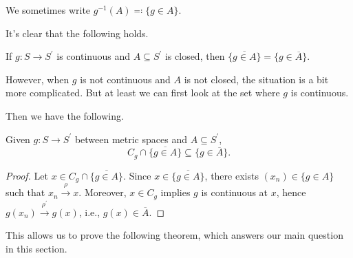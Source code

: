 \begin{notation}
	We sometimes write \(g ^{-1} (A) \eqqcolon \{ g \in A \} \).
\end{notation}

It's clear that the following holds.

\begin{note}
	If \(g \colon S \to S^{\prime} \) is continuous and \(A \subseteq S^{\prime} \) is closed, then \(\overline{\{ g \in A \} } = \{ g \in \overline{A} \}\).
\end{note}

However, when \(g\) is not continuous and \(A\) is not closed, the situation is a bit more complicated. But at least we can first look at the set where \(g\) is continuous.


Then we have the following.

\begin{proposition}\label{prop:lec4}
	Given \(g\colon S \to S^{\prime} \) between metric spaces and \(A \subseteq S^{\prime} \),
	\[
		C_g \cap \overline{\{ g\in A \} }
		\subseteq \{ g \in \overline{A}  \}.
	\]
\end{proposition}
\begin{proof}
	Let \(x \in C_g \cap \overline{\{ g\in A \} }\). Since \(x\in \overline{\{ g\in A \} }\), there exists \((x_n) \in \{ g\in A \} \) such that \(x_n \overset{\rho }{\to } x\). Moreover, \(x\in C_g\) implies \(g\) is continuous at \(x\), hence \(g(x_n) \overset{\rho ^{\prime} }{\to } g(x)\), i.e., \(g(x) \in \overline{A} \).
\end{proof}

This allows us to prove the following theorem, which answers our main question in this section.

